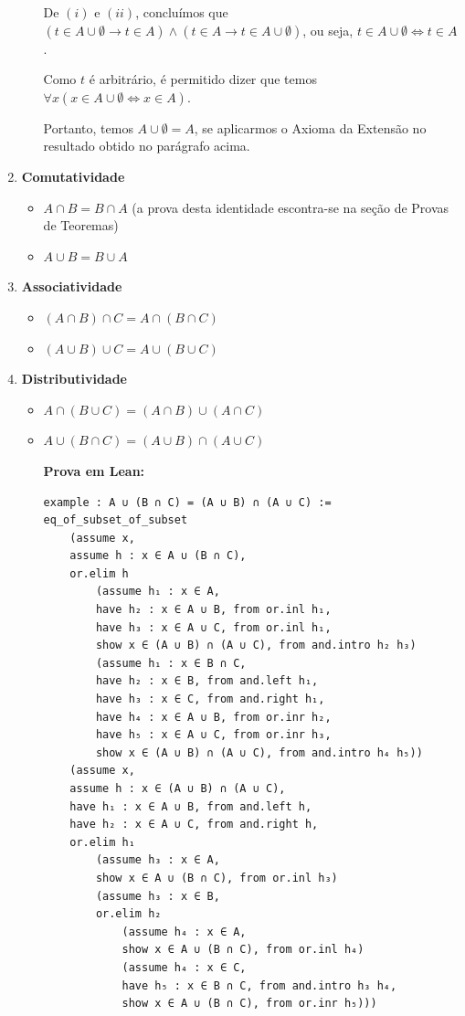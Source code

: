 \begin{enumerate}
\begin{itemize}
De $(i)$ e $(ii)$, concluímos que $ (t \in A \cup \emptyset \rightarrow t \in A ) \wedge (t \in A \rightarrow t \in A \cup \emptyset) $, ou seja, $t \in A \cup \emptyset \iff t \in A $.

Como $t$ é arbitrário, é permitido dizer que temos $\forall x (x \in A \cup \emptyset \iff x \in A) $.

Portanto, temos $A \cup \emptyset = A$, se aplicarmos o Axioma da Extensão no resultado obtido no parágrafo acima.

\qquad

\end{itemize}

\item{\textbf{Comutatividade}}
\begin{itemize}
\item $A \cap B = B \cap A$ (a prova desta identidade escontra-se na seção de Provas de Teoremas)
\item $A \cup B = B \cup A$
\end{itemize}

\item{\textbf{Associatividade}}
\begin{itemize}
\item $(A \cap B) \cap C = A \cap (B \cap C)$
\item $(A \cup B) \cup C = A \cup (B \cup C)$
\end{itemize}

\item{\textbf{Distributividade}}
\begin{itemize}
\item $A \cap (B \cup C) = (A \cap B) \cup (A \cap C)$
\item $A \cup (B \cap C) = (A \cup B) \cap (A \cup C)$

\textbf{Prova em Lean:}
\begin{lstlisting}
example : A ∪ (B ∩ C) = (A ∪ B) ∩ (A ∪ C) :=
eq_of_subset_of_subset
    (assume x,
    assume h : x ∈ A ∪ (B ∩ C),
    or.elim h
        (assume h₁ : x ∈ A,
        have h₂ : x ∈ A ∪ B, from or.inl h₁,
        have h₃ : x ∈ A ∪ C, from or.inl h₁,
        show x ∈ (A ∪ B) ∩ (A ∪ C), from and.intro h₂ h₃)
        (assume h₁ : x ∈ B ∩ C,
        have h₂ : x ∈ B, from and.left h₁,
        have h₃ : x ∈ C, from and.right h₁,
        have h₄ : x ∈ A ∪ B, from or.inr h₂,
        have h₅ : x ∈ A ∪ C, from or.inr h₃,
        show x ∈ (A ∪ B) ∩ (A ∪ C), from and.intro h₄ h₅))
    (assume x,
    assume h : x ∈ (A ∪ B) ∩ (A ∪ C),
    have h₁ : x ∈ A ∪ B, from and.left h,
    have h₂ : x ∈ A ∪ C, from and.right h,
    or.elim h₁
        (assume h₃ : x ∈ A,
        show x ∈ A ∪ (B ∩ C), from or.inl h₃)
        (assume h₃ : x ∈ B,
        or.elim h₂
            (assume h₄ : x ∈ A,
            show x ∈ A ∪ (B ∩ C), from or.inl h₄)
            (assume h₄ : x ∈ C,
            have h₅ : x ∈ B ∩ C, from and.intro h₃ h₄,
            show x ∈ A ∪ (B ∩ C), from or.inr h₅))) \end{lstlisting}


\end{itemize}
\end{enumerate}
